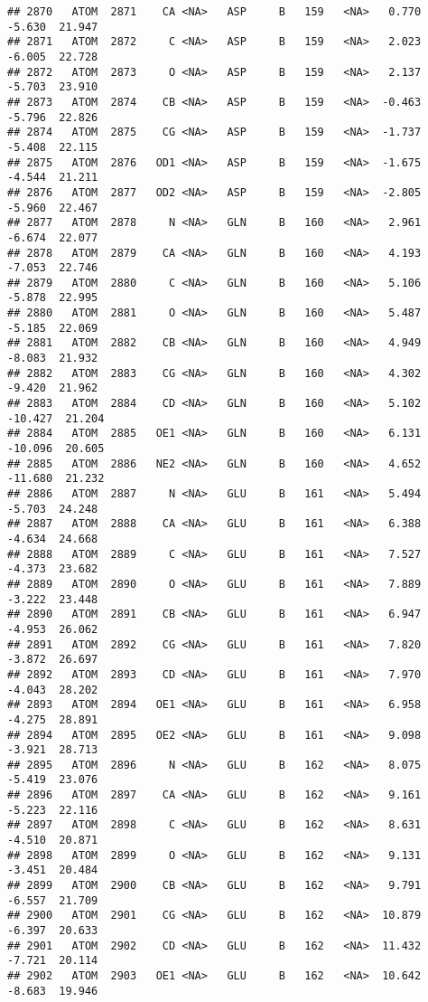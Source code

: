 \documentclass[
]{article}
\begin{document}
\begin{verbatim}
## 2870   ATOM  2871    CA <NA>   ASP     B   159   <NA>   0.770  -5.630  21.947
## 2871   ATOM  2872     C <NA>   ASP     B   159   <NA>   2.023  -6.005  22.728
## 2872   ATOM  2873     O <NA>   ASP     B   159   <NA>   2.137  -5.703  23.910
## 2873   ATOM  2874    CB <NA>   ASP     B   159   <NA>  -0.463  -5.796  22.826
## 2874   ATOM  2875    CG <NA>   ASP     B   159   <NA>  -1.737  -5.408  22.115
## 2875   ATOM  2876   OD1 <NA>   ASP     B   159   <NA>  -1.675  -4.544  21.211
## 2876   ATOM  2877   OD2 <NA>   ASP     B   159   <NA>  -2.805  -5.960  22.467
## 2877   ATOM  2878     N <NA>   GLN     B   160   <NA>   2.961  -6.674  22.077
## 2878   ATOM  2879    CA <NA>   GLN     B   160   <NA>   4.193  -7.053  22.746
## 2879   ATOM  2880     C <NA>   GLN     B   160   <NA>   5.106  -5.878  22.995
## 2880   ATOM  2881     O <NA>   GLN     B   160   <NA>   5.487  -5.185  22.069
## 2881   ATOM  2882    CB <NA>   GLN     B   160   <NA>   4.949  -8.083  21.932
## 2882   ATOM  2883    CG <NA>   GLN     B   160   <NA>   4.302  -9.420  21.962
## 2883   ATOM  2884    CD <NA>   GLN     B   160   <NA>   5.102 -10.427  21.204
## 2884   ATOM  2885   OE1 <NA>   GLN     B   160   <NA>   6.131 -10.096  20.605
## 2885   ATOM  2886   NE2 <NA>   GLN     B   160   <NA>   4.652 -11.680  21.232
## 2886   ATOM  2887     N <NA>   GLU     B   161   <NA>   5.494  -5.703  24.248
## 2887   ATOM  2888    CA <NA>   GLU     B   161   <NA>   6.388  -4.634  24.668
## 2888   ATOM  2889     C <NA>   GLU     B   161   <NA>   7.527  -4.373  23.682
## 2889   ATOM  2890     O <NA>   GLU     B   161   <NA>   7.889  -3.222  23.448
## 2890   ATOM  2891    CB <NA>   GLU     B   161   <NA>   6.947  -4.953  26.062
## 2891   ATOM  2892    CG <NA>   GLU     B   161   <NA>   7.820  -3.872  26.697
## 2892   ATOM  2893    CD <NA>   GLU     B   161   <NA>   7.970  -4.043  28.202
## 2893   ATOM  2894   OE1 <NA>   GLU     B   161   <NA>   6.958  -4.275  28.891
## 2894   ATOM  2895   OE2 <NA>   GLU     B   161   <NA>   9.098  -3.921  28.713
## 2895   ATOM  2896     N <NA>   GLU     B   162   <NA>   8.075  -5.419  23.076
## 2896   ATOM  2897    CA <NA>   GLU     B   162   <NA>   9.161  -5.223  22.116
## 2897   ATOM  2898     C <NA>   GLU     B   162   <NA>   8.631  -4.510  20.871
## 2898   ATOM  2899     O <NA>   GLU     B   162   <NA>   9.131  -3.451  20.484
## 2899   ATOM  2900    CB <NA>   GLU     B   162   <NA>   9.791  -6.557  21.709
## 2900   ATOM  2901    CG <NA>   GLU     B   162   <NA>  10.879  -6.397  20.633
## 2901   ATOM  2902    CD <NA>   GLU     B   162   <NA>  11.432  -7.721  20.114
## 2902   ATOM  2903   OE1 <NA>   GLU     B   162   <NA>  10.642  -8.683  19.946

\end{verbatim}
\end{document}
